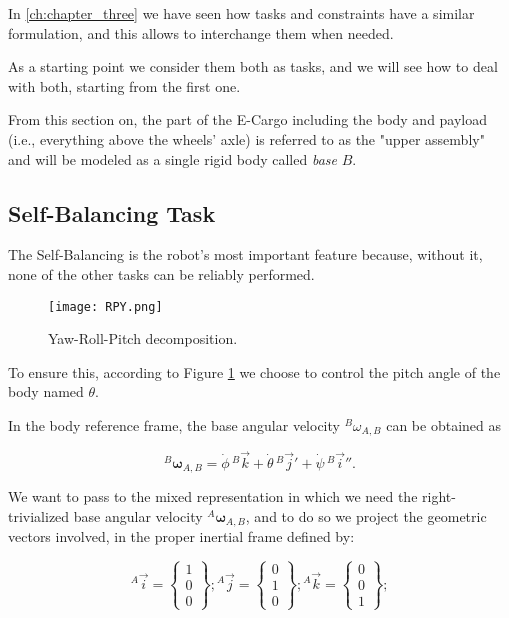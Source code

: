 In \cref{ch:chapter_three} we have seen how tasks and constraints have a similar formulation, and this allows to interchange them when needed.

As a starting point we consider them both as tasks, and we will see how to deal with both, starting from the first one.

From this section on, the part of the E-Cargo including the body and payload (i.e., everything above the wheels' axle) is referred to as the "upper assembly" and will be modeled as a single rigid body called \textit{base} $B$.

\subsection{Self-Balancing Task}
\label{subsec:Self-Balancing Task}

The Self-Balancing is the robot's most important feature because, without it, none of the other tasks can be reliably performed.

\begin{figure}
    \centering
    \texttt{[image: RPY.png]}
    \caption{Yaw-Roll-Pitch decomposition.}
    \label{fig:Yaw-Roll-Pitch decomposition}
\end{figure}

To ensure this, according to Figure \ref{fig:Yaw-Roll-Pitch decomposition} we choose to control the pitch angle of the body named $\theta$.

In the body reference frame, the base angular velocity ${}^{B} \omega_{A,B}$ can be obtained as

\begin{equation}
    {}^{B} \bm{\omega}_{A,B} = \dot{\phi}\,{}^{B}\vec{k} + \dot{\theta}\,{}^{B}\vec{j}' + \dot{\psi}\,{}^{B}\vec{i}''.
    \label{eq:Base_ang_Vel}
\end{equation}

We want to pass to the mixed representation in which we need the right-trivialized base angular velocity ${}^{A} \bm{\omega}_{A,B}$, and to do so we project the geometric vectors involved, in the proper inertial frame defined by:

\begin{equation*}
    {}^{A}\vec{i} = \begin{Bmatrix}
        1 \\
        0 \\
        0
    \end{Bmatrix} ;     {}^{A}\vec{j} = \begin{Bmatrix}
        0 \\
        1 \\
        0
    \end{Bmatrix} ; {}^{A}\vec{k} = \begin{Bmatrix}
        0 \\
        0 \\
        1
    \end{Bmatrix};
\end{equation*}

